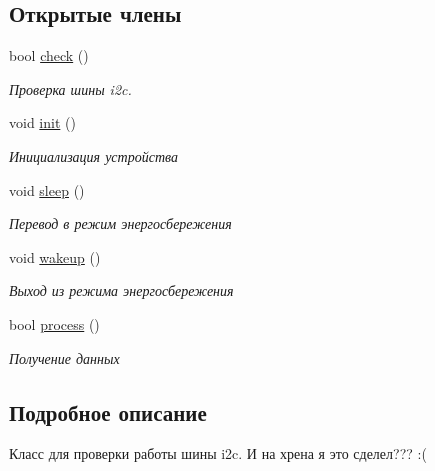 \subsection*{Открытые члены}
\begin{DoxyCompactItemize}
\item 
bool \hyperlink{classunit_1_1_t_i2_c_a9c392b005548ff42ea8bb0b2255f3779}{check} ()
\begin{DoxyCompactList}\small\item\em Проверка шины i2c. \end{DoxyCompactList}\item 
\mbox{\label{classunit_1_1_t_i2_c_a46f9d970fea74ff43f651c92d51cbd7b}} 
void \hyperlink{classunit_1_1_t_i2_c_a46f9d970fea74ff43f651c92d51cbd7b}{init} ()
\begin{DoxyCompactList}\small\item\em Инициализация устройства \end{DoxyCompactList}\item 
\mbox{\label{classunit_1_1_t_i2_c_a41cbc4e99cb054156f912d69f84c33e6}} 
void \hyperlink{classunit_1_1_t_i2_c_a41cbc4e99cb054156f912d69f84c33e6}{sleep} ()
\begin{DoxyCompactList}\small\item\em Перевод в режим энергосбережения \end{DoxyCompactList}\item 
\mbox{\label{classunit_1_1_t_i2_c_a976bf21ac417f9c8301ca5501c3b1c34}} 
void \hyperlink{classunit_1_1_t_i2_c_a976bf21ac417f9c8301ca5501c3b1c34}{wakeup} ()
\begin{DoxyCompactList}\small\item\em Выход из режима энергосбережения \end{DoxyCompactList}\item 
\mbox{\label{classunit_1_1_t_i2_c_a246ec834efdab90310976fb19f8047cb}} 
bool \hyperlink{classunit_1_1_t_i2_c_a246ec834efdab90310976fb19f8047cb}{process} ()
\begin{DoxyCompactList}\small\item\em Получение данных \end{DoxyCompactList}\end{DoxyCompactItemize}


\subsection{Подробное описание}
Класс для проверки работы шины i2c. И на хрена я это сделел??? \+:( 

